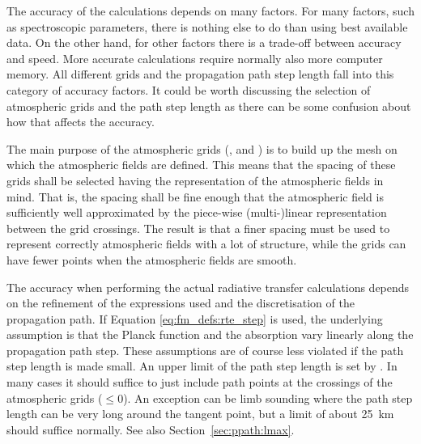 The accuracy of the calculations depends on many factors. For many
factors, such as spectroscopic parameters, there is nothing else to do
than using best available data. On the other hand, for other factors
there is a trade-off between accuracy and speed. More accurate
calculations require normally also more computer memory. All
different grids and the propagation path step length fall into this
category of accuracy factors. It could be worth discussing the
selection of atmospheric grids and the path step length as there can
be some confusion about how that affects the accuracy.

The main purpose of the atmospheric grids (,
 and ) is to build up the
mesh on which the atmospheric fields are defined. This means that the
spacing of these grids shall be selected having the representation of
the atmospheric fields in mind. That is, the spacing shall be fine
enough that the atmospheric field is sufficiently well approximated by
the piece-wise (multi-)linear representation between the grid
crossings. The result is that a finer spacing must be used to
represent correctly atmospheric fields with a lot of structure, while
the grids can have fewer points when the atmospheric fields are
smooth. 

The accuracy when performing the actual radiative transfer calculations depends
on the refinement of the expressions used and the discretisation of the
propagation path. If Equation \ref{eq:fm_defs:rte_step} is used, the
underlying assumption is that the Planck function and the absorption vary
linearly along the propagation path step. These assumptions are of course less
violated if the path step length is made small. An upper limit of the path step
length is set by . In many cases it should suffice to
just include path points at the crossings of the atmospheric grids
($\leq0$). An exception can be limb sounding where the
path step length can be very long around the tangent point, but a limit of
about 25~km should suffice normally. See also Section~\ref{sec:ppath:lmax}.


